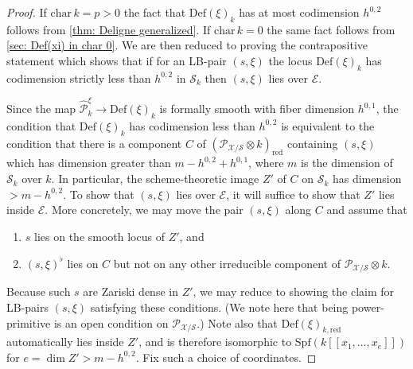 \documentclass[letter, 11pt]{article}
\theoremstyle{plain}
\theoremstyle{definition}
\newcommand\tensor{{\otimes}}
\newcommand{\<}{\langle}
\renewcommand{\>}{\rangle}
\newcommand{\sX}{\mathcal{X}}
\newcommand{\sS}{\mathcal{S}}
\newcommand{\sE}{\mathcal{E}}
\newcommand{\Spf}{\mathrm{Spf}}
\newcommand{\shP}{\mathscr{P}}
\newcommand{\Def}{\mathrm{Def}}
\newcommand{\red}{\mathrm{red}}
\begin{document}
\begin{proof}
If $\textrm{char}\, k = p > 0$ the fact that $\Def(\xi)_k$ has at most codimension $h^{0,2}$ follows from \ref{thm: Deligne generalized}. If $\textrm{char}\, k = 0$ the same fact follows from \ref{sec: Def(xi) in char 0}. We are then reduced to proving the contrapositive statement which shows that if for an LB-pair $(s, \xi)$ the locus $\Def(\xi)_k$ has codimension strictly less than $h^{0,2}$ in $\sS_{k}$ then $(s, \xi)$ lies over $\sE$. 

Since the map $\hat{\shP}^\xi_k \to \Def(\xi)_k$ is formally smooth with fiber dimension $h^{0, 1}$, the condition that $\Def(\xi)_k$ has codimension less than $h^{0,2}$ is equivalent to the condition that there is a component $C$ of $(\shP_{\sX/\sS} \tensor k)_\red$ containing $(s, \xi)$ which has dimension greater than $m - h^{0, 2} + h^{0, 1}$, where $m$ is the dimension of $\sS_{k}$ over $k$. In particular, the scheme-theoretic image $Z'$ of $C$ on $\sS_k$ has dimension $> m - h^{0, 2}$. To show that $(s, \xi)$ lies over $\sE$, it will suffice to show that $Z'$ lies inside $\sE$. More concretely, we may move the pair $(s, \xi)$ along $C$ and assume that 
\begin{enumerate}[label=(\alph*)]
    \item $s$ lies on the smooth locus of $Z'$, and 
    \item $(s, \xi)^\flat$ lies on $C$ but not on any other irreducible component of $\shP_{\sX/\sS} \otimes k$.
\end{enumerate}
Because such $s$ are Zariski dense in $Z'$, we may reduce to showing the claim for LB-pairs $(s, \xi)$ satisfying these conditions. (We note here that being power-primitive is an open condition on $\shP_{\sX/\sS}$.) Note also that $\Def(\xi)_{k,\red}$ automatically lies inside $Z'$, and is therefore isomorphic to $\Spf(k[\![x_{1}, \hdots, x_{e}]\!])$ for $e = \dim Z' > m - h^{0, 2}$. Fix such a choice of coordinates. 


\end{proof}
\end{document}
